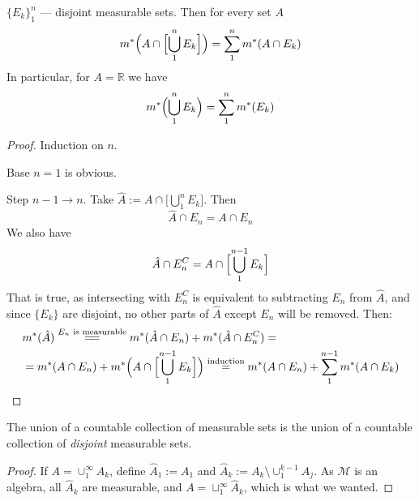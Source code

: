 \begin{proposition}
    \label{prop:disjointIntersectionSum}
    $\{E_k\}_1^n$ --- disjoint measurable sets. Then for every set $A$
    \[
        m^*\Bigl(A \cap \Bigl[\bigcup_1^n E_k\Bigr]\Bigr) = \sum_1^n m^*(A \cap E_k)
    \]
    In particular, for $A = \mathbb{R}$ we have
    \[
        m^*\Bigl(\bigcup_1^n E_k\Bigr) = \sum_1^n m^*(E_k)
    \]
\end{proposition}
\begin{proof}
    Induction on $n$.

    Base $n=1$ is obvious.

    Step $n - 1 \to n$. Take $\hat{A} := A \cap \bigl[ \bigcup_1^n E_k \bigr]$.
    Then \[\hat{A} \cap E_n = A \cap E_n \]
    We also have \[\hat{A} \cap E_n^C = A \cap \Bigl[ \bigcup_1^{n - 1} E_k \Bigr]\]
    That is true, as intersecting 
    with $E_n^C$ is equivalent to subtracting $E_n$ from $\hat{A}$, and since
    $\{E_k\}$ are disjoint, no other parts of $\hat{A}$ except $E_n$ will be removed. Then:
    \begin{align*}
        &m^*(\hat{A}) \overset{E_n \text{ is measurable}}{=\joinrel=} m^*(\hat{A} \cap E_n) + m^*(\hat{A} \cap E_n^C)
        =
        \\&
        = m^*(A \cap E_n) + m^*\Bigl(A \cap \Bigl[\bigcup_{1}^{n-1} E_k\Bigr]\Bigr)
        \overset{\text{induction}}{=} m^*(A \cap E_n) + \sum_{1}^{n-1} m^*(A \cap E_k)
    \end{align*}
\end{proof}

\begin{proposition}
    \label{prop:unionOfCountable}
    The union of a countable collection of measurable sets is the union
    of a countable collection of \textit{disjoint} measurable sets.
\end{proposition}
\begin{proof}
    If $A = \cup_1^\infty A_k$, define $\hat{A}_1 := A_1$ and
    $\hat{A}_k := A_k \setminus \cup_1^{k-1} A_j$.
    As $\mathcal{M}$ is an algebra, all $\hat{A}_k$ are measurable, and
    $A = \sqcup_1^\infty \hat{A}_k$, which is what we wanted.
\end{proof}

